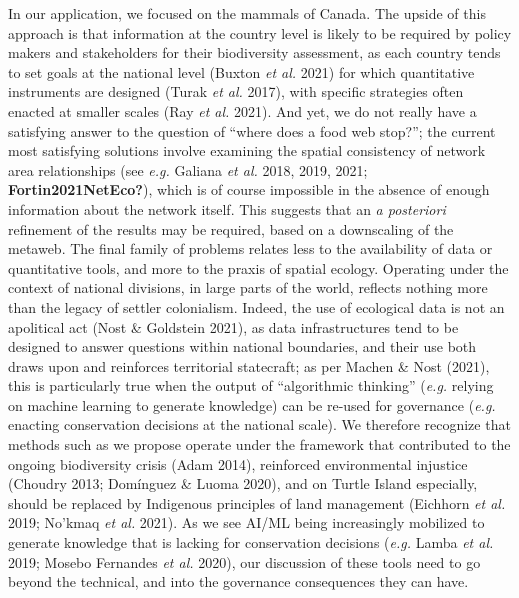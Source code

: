 \documentclass[10pt,oneside]{article}
\begin{document}
In our application, we focused on the mammals of Canada. The upside of
this approach is that information at the country level is likely to be
required by policy makers and stakeholders for their biodiversity
assessment, as each country tends to set goals at the national level
(Buxton \emph{et al.} 2021) for which quantitative instruments are
designed (Turak \emph{et al.} 2017), with specific strategies often
enacted at smaller scales (Ray \emph{et al.} 2021). And yet, we do not
really have a satisfying answer to the question of ``where does a food
web stop?''; the current most satisfying solutions involve examining the
spatial consistency of network area relationships (see \emph{e.g.}
Galiana \emph{et al.} 2018, 2019, 2021; \textbf{Fortin2021NetEco?}),
which is of course impossible in the absence of enough information about
the network itself. This suggests that an \emph{a posteriori} refinement
of the results may be required, based on a downscaling of the metaweb.
The final family of problems relates less to the availability of data or
quantitative tools, and more to the praxis of spatial ecology. Operating
under the context of national divisions, in large parts of the world,
reflects nothing more than the legacy of settler colonialism. Indeed,
the use of ecological data is not an apolitical act (Nost \& Goldstein
2021), as data infrastructures tend to be designed to answer questions
within national boundaries, and their use both draws upon and reinforces
territorial statecraft; as per Machen \& Nost (2021), this is
particularly true when the output of ``algorithmic thinking''
(\emph{e.g.} relying on machine learning to generate knowledge) can be
re-used for governance (\emph{e.g.} enacting conservation decisions at
the national scale). We therefore recognize that methods such as we
propose operate under the framework that contributed to the ongoing
biodiversity crisis (Adam 2014), reinforced environmental injustice
(Choudry 2013; Domínguez \& Luoma 2020), and on Turtle Island
especially, should be replaced by Indigenous principles of land
management (Eichhorn \emph{et al.} 2019; No'kmaq \emph{et al.} 2021). As
we see AI/ML being increasingly mobilized to generate knowledge that is
lacking for conservation decisions (\emph{e.g.} Lamba \emph{et al.}
2019; Mosebo Fernandes \emph{et al.} 2020), our discussion of these
tools need to go beyond the technical, and into the governance
consequences they can have.
\end{document}
